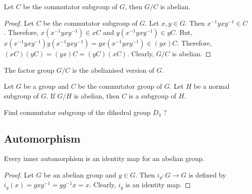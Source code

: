 \begin{remark}
	Let $C$ be the commutator subgroup of $G$, then $G/C$ is abelian.%
\end{remark}
\begin{proof}
	Let $C$ be the commutator subgroup of $G$. Let $x,y \in G$. Then $x^{-1}yxy^{-1} \in C$. Therefore, $x(x^{-1}yxy^{-1}) \in xC$ and $y(x^{-1}yxy^{-1}) \in yC$. But, $x(x^{-1}yxy^{-1})y(x^{-1}yxy^{-1}) = yx(x^{-1}yxy^{-1}) \in (yx)C$. Therefore, $(xC)(yC) = (yx)C = (yC)(xC)$. Clearly, $G/C$ is abelian.
\end{proof}

\begin{remark}
	The factor group $G/C$ is the abelianised version of $G$.
\end{remark}

\begin{remark}
	Let $G$ be a group and $C$ be the commutator group of $G$. Let $H$ be a normal subgroup of $G$. If $G/H$ is abelian, then $C$ is a subgroup of $H$.
\end{remark}

\begin{question}
	Find commutator subgroup of the dihedral group $D_4$ ?
\end{question}

\subsection{Automorphism}
\begin{remark}
	Every inner automorphism is an identity map for an abelian group. %
\end{remark}
\begin{proof}
	Let $G$ be an abelian group and $g \in G$. Then $i_g : G \to G$ is defined by $i_g(x) = gxg^{-1} = gg^{-1}x = x$. Clearly, $i_g$ is an identity map.
\end{proof}

